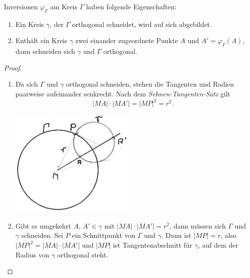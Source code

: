 \begin{thm}\label{thm:satz.s4b}
    Inversionen $\varphi_\Gamma$ am Kreis $\Gamma$ haben folgende Eigenschaften:

    \renewcommand{\labelenumi}{\alph{enumi})} %
    \begin{enumerate}
        \item Ein Kreis $\gamma$, der $\Gamma$ orthogonal schneidet, wird auf sich abgebildet.

        \item Enthält ein Kreis $\gamma$ zwei einander zugeordnete Punkte $A$ und
            $A' = \varphi_\Gamma(A)$, dann schneiden sich $\gamma$ und $\Gamma$ orthogonal.

    \end{enumerate}
\end{thm}

\begin{proof}
    \renewcommand{\labelenumi}{\alph{enumi})} %
    \begin{enumerate}
        \item Da sich $\Gamma$ und $\gamma$ orthogonal schneiden, stehen die Tangenten und Radien
            paarweise aufeinander senkrecht. Nach dem {\em Sehnen-Tangenten-Satz}
            gilt
            $$
                |MA| \cdot |MA'| = |MP|^2 = r^2.
            $$
            \centerline{\includegraphics[width=6cm]{BILDER/4-2-02b-Inversion.jpg}}

        \item Gibt es umgekehrt $A,\, A' \in \gamma$ mit $|MA| \cdot |MA'| = r^2$, dann müssen sich
            $\Gamma$ und $\gamma$ schneiden. Sei $P$ ein Schnittpunkt von $\Gamma$ und $\gamma$.
            Dann ist $|MP| = r$, also $|MP|^2 = |MA| \cdot |MA'|$ und $|MP|$ ist Tangentenabschnitt
            für $\gamma$, auf dem der Radius von $\gamma$ orthogonal steht.
    \end{enumerate}
\end{proof}

